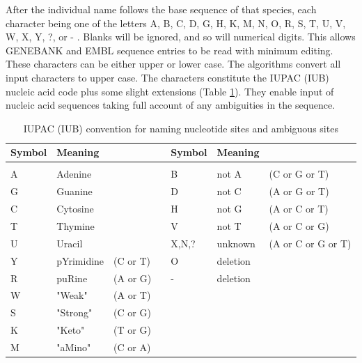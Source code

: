 After  the individual name 
follows  the  base  sequence  of  that species, each character being one of the 
letters A, B, C, D, G, H, K, M, N, O, R, S, T, U, V, W, X, Y, ?, or - .  Blanks will be ignored, and so 
will  numerical  digits.   This  allows GENEBANK and EMBL sequence entries to be 
read with minimum editing.      These characters can be  either  upper  or  lower  case.   The  algorithms 
convert  all  input  characters  to upper case. 
The characters constitute the IUPAC (IUB) nucleic acid code  plus  some  slight 
extensions (Table \ref{iupac}).  They enable input of nucleic acid sequences taking full account of 
any ambiguities in the sequence.   
\begin{table}[hpbt]
\caption{IUPAC (IUB) convention for naming nucleotide sites and ambiguous sites} \label{iupac}                                            
\begin{center}
\begin{tabular}{lll c lll}        
\hline                                                                
Symbol & Meaning  & && Symbol & Meaning\\
\hline            \\                                                   
A & Adenine      & && B & not A & (C or G or T)  \\                                                   
G & Guanine      & &&D & not C & (A or G or T)\\                                             
C & Cytosine      &&& H & not G & (A or C or T) \\                                           
T & Thymine       &&& V & not T & (A or C or G)\\                                             
U & Uracil        &&&X,N,? & unknown & (A or C or G or T)\\                                          
Y & pYrimidine & (C or T)  &&O & deletion              \\                                      
R & puRine & (A or G)   &&- & deletion   \\                                 
W & "Weak" & (A or T)      \\                                 
S & "Strong" & (C or G)    \\                                  
K & "Keto" & (T or G)      \\                              
M & "aMino" & (C or A)     \\                                
\end{tabular}
\end{center}
\end{table}

